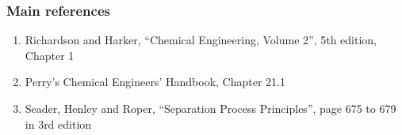 \begin{frame}\frametitle{Main references}
	\begin{enumerate}
		\item	Richardson and Harker, ``Chemical Engineering, Volume 2'', 5th edition, Chapter 1
		\item	Perry's Chemical Engineers' Handbook, Chapter 21.1
		\item	Seader, Henley and Roper, ``Separation Process Principles'', page 675 to 679 in 3rd edition 
	\end{enumerate}
	
	
\end{frame}